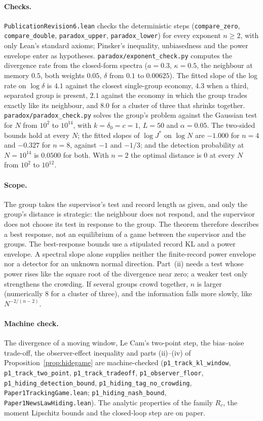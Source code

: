 \documentclass[12pt]{article}
\theoremstyle{definition}
\theoremstyle{remark}
\begin{document}
\paragraph{Checks.} \nolinkurl{PublicationRevision6.lean} checks the deterministic steps (\nolinkurl{compare_zero}, \nolinkurl{compare_double}, \nolinkurl{paradox_upper}, \nolinkurl{paradox_lower}) for every exponent $n\ge2$, with only Lean's standard axioms; Pinsker's inequality, unbiasedness and the power envelope enter as hypotheses. \nolinkurl{paradox/exponent_check.py} computes the divergence rate from the closed-form spectra ($a=0.3$, $\kappa=0.5$, the neighbour at memory $0.5$, both weights $0.05$, $\delta$ from $0.1$ to $0.00625$). The fitted slope of the log rate on $\log\delta$ is $4.1$ against the closest single-group economy, $4.3$ when a third, separated group is present, $2.1$ against the economy in which the group trades exactly like its neighbour, and $8.0$ for a cluster of three that shrinks together. \nolinkurl{paradox/paradox_check.py} solves the group's problem against the Gaussian test for $N$ from $10^2$ to $10^{14}$, with $k=\delta_0=c=1$, $L=50$ and $\alpha=0.05$. The two-sided bounds hold at every $N$; the fitted slopes of $\log J^*$ on $\log N$ are $-1.000$ for $n=4$ and $-0.327$ for $n=8$, against $-1$ and $-1/3$; and the detection probability at $N=10^{14}$ is $0.0500$ for both. With $n=2$ the optimal distance is $0$ at every $N$ from $10^2$ to $10^{12}$.

\paragraph{Scope.} The group takes the supervisor's test and record length as given, and only the group's distance is strategic: the neighbour does not respond, and the supervisor does not choose its test in response to the group. The theorem therefore describes a best response, not an equilibrium of a game between the supervisor and the groups. The best-response bounds use a stipulated record KL and a power envelope. A spectral slope alone supplies neither the finite-record power envelope nor a detector for an unknown normal direction. Part~(ii) needs a test whose power rises like the square root of the divergence near zero; a weaker test only strengthens the crowding. If several groups crowd together, $n$ is larger (numerically $8$ for a cluster of three), and the information falls more slowly, like $N^{-2/(n-2)}$.

\paragraph{Machine check.} The divergence of a moving window, Le Cam's two-point step, the bias--noise trade-off, the observer-effect inequality and parts (ii)--(iv) of Proposition~\ref{prop:hidegame} are machine-checked (\texttt{p1\_track\_kl\_window}, \texttt{p1\_track\_two\_point}, \texttt{p1\_track\_tradeoff}, \texttt{p1\_observer\_floor}, \texttt{p1\_hiding\_detection\_bound}, \texttt{p1\_hiding\_tag\_no\_crowding}, \nolinkurl{Paper1TrackingGame.lean}; \texttt{p1\_hiding\_nash\_bound}, \nolinkurl{Paper1NewsLawHiding.lean}). The analytic properties of the family $R_c$, the moment Lipschitz bounds and the closed-loop step are on paper.
\end{document}

